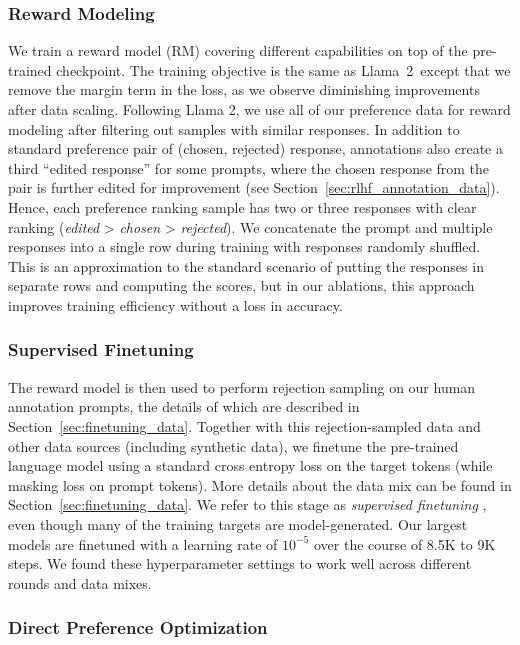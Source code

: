 \subsubsection{Reward Modeling}
\label{subsubsec:rm}

We train a reward model (RM) covering different capabilities on top of the pre-trained checkpoint. The training objective is the same as Llama~2~except that we remove the margin term in the loss, as we observe diminishing improvements after data scaling. Following Llama 2, we use all of our preference data for reward modeling after filtering out samples with similar responses. In addition to standard preference pair of (chosen, rejected) response, annotations also create a third ``edited response'' for some prompts, where the chosen response from the pair is further edited for improvement (see Section~\ref{sec:rlhf_annotation_data}). Hence, each preference ranking sample has two or three responses with clear ranking (\emph{edited} > \emph{chosen} > \emph{rejected}). We concatenate the prompt and multiple responses into a single row during training with responses randomly shuffled. This is an approximation to the standard scenario of putting the responses in separate rows and computing the scores, but in our ablations, this approach improves training efficiency without a loss in accuracy. 

\subsubsection{Supervised Finetuning}
\label{subsubsec:sft}
The reward model is then used to perform rejection sampling on our human annotation prompts, the details of which are described in Section~\ref{sec:finetuning_data}. Together with this rejection-sampled data and other data sources (including synthetic data), we finetune the pre-trained language model using a standard cross entropy loss on the target tokens (while masking loss on prompt tokens). More details about the data mix can be found in Section~\ref{sec:finetuning_data}.
We refer to this stage as \emph{supervised finetuning} \citep[SFT;][]{weifinetuned,sanh2022multitask,wang2022super}, even though many of the training targets are model-generated. Our largest models are finetuned with a learning rate of $10^{-5}$ over the course of 8.5K to 9K steps. We found these hyperparameter settings to work well across different rounds and data mixes.

\subsubsection{Direct Preference Optimization}
\label{subsubsec:postdpo}

